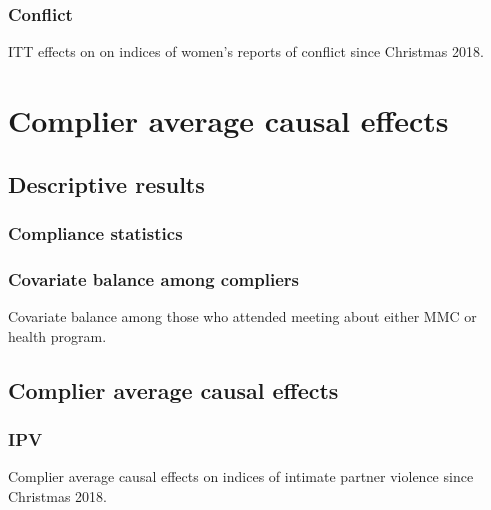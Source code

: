 \documentclass[11pt,english]{article}
\begin{document}
\subsubsection{Conflict}

\begin{table}[H]
\centering

\caption{ITT effects on on indices of women's reports of conflict since Christmas 2018.}
\label{tab:conflict_results_w}
\end{table}

\section{Complier average causal effects}

\subsection{Descriptive results}

\subsubsection{Compliance statistics}

\subsubsection{Covariate balance among compliers}

\begin{table}[H]
\centering

\caption{Covariate balance among those who attended meeting about either MMC or health program.}
\label{tab:complier_balance_results}
\end{table}

\subsection{Complier average causal effects}

\subsubsection{IPV}

\begin{table}[H]
\centering

\caption{Complier average causal effects on indices of intimate partner violence since Christmas 2018.}
\label{tab:ompliers_ipv}
\end{table}
\end{document}
